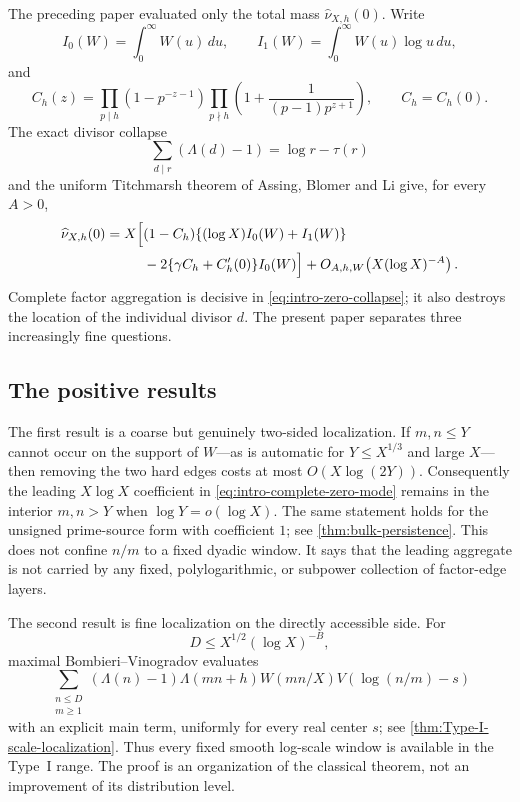 The preceding paper \citep{WangTPCNine2026} evaluated only the total mass
$\widehat\nu_{X,h}(0)$.  Write
\begin{equation}\label{eq:intro-Ij}
 I_0(W)=\int_0^\infty W(u)\,du,
 \qquad
 I_1(W)=\int_0^\infty W(u)\log u\,du,
\end{equation}
and
\begin{equation}\label{eq:intro-Chs}
 C_h(z)=
 \prod_{p\mid h}(1-p^{-z-1})
 \prod_{p\nmid h}\left(1+\frac1{(p-1)p^{z+1}}\right),
 \qquad C_h=C_h(0).
\end{equation}
The exact divisor collapse
\begin{equation}\label{eq:intro-zero-collapse}
 \sum_{d\mid r}(\Lambda(d)-1)=\log r-\tau(r)
\end{equation}
and the uniform Titchmarsh theorem of Assing, Blomer and Li
\citep{AssingBlomerLi2021} give, for every $A>0$,
\begin{align}
 \widehat\nu_{X,h}(0)
 =X\Big[&(1-C_h)\{(\log X)I_0(W)+I_1(W)\}
 \notag\\
 &-2\{\gamma C_h+C_h'(0)\}I_0(W)\Big]
 +O_{A,h,W}\!\left(X(\log X)^{-A}\right).
 \label{eq:intro-complete-zero-mode}
\end{align}
Complete factor aggregation is decisive in
\eqref{eq:intro-zero-collapse}; it also destroys the location of the
individual divisor $d$.  The present paper separates three increasingly
fine questions.

\subsection{The positive results}

The first result is a coarse but genuinely two-sided localization.  If
$m,n\leq Y$ cannot occur on the support of $W$---as is automatic for
$Y\leq X^{1/3}$ and large $X$---then removing the two hard edges costs at
most $O(X\log(2Y))$.  Consequently the leading $X\log X$ coefficient in
\eqref{eq:intro-complete-zero-mode} remains in the interior $m,n>Y$ when
$\log Y=o(\log X)$.  The same statement holds for the unsigned
prime-source form with coefficient $1$; see
\cref{thm:bulk-persistence}.  This does not confine $n/m$ to a fixed
dyadic window.  It says that the leading aggregate is not carried by any
fixed, polylogarithmic, or subpower collection of factor-edge layers.

The second result is fine localization on the directly accessible side.
For
\begin{equation}\label{eq:intro-Type-I-range}
 D\leq X^{1/2}(\log X)^{-B},
\end{equation}
maximal Bombieri--Vinogradov evaluates
\begin{equation}\label{eq:intro-Type-I-local-form}
 \sum_{\substack{n\leq D\\m\geq1}}
 (\Lambda(n)-1)\Lambda(mn+h)W(mn/X)
 V(\log(n/m)-s)
\end{equation}
with an explicit main term, uniformly for every real center $s$; see
\cref{thm:Type-I-scale-localization}.  Thus every fixed smooth log-scale
window is available in the Type~I range.  The proof is an organization
of the classical theorem, not an improvement of its distribution level.

